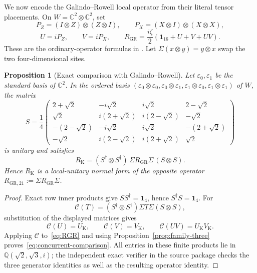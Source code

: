 \documentclass[11pt]{article}
\newtheorem{proposition}[theorem]{Proposition}
\theoremstyle{remark}
\newcommand{\Id}{\mathbf 1}
\newcommand{\bbC}{\mathbb C}
\newcommand{\bbQ}{\mathbb Q}
\begin{document}
We now encode the Galindo--Rowell local operator from their literal tensor
placements.  On \(W=\bbC^2\otimes\bbC^2\), set
\[
  P_Z=(I\otimes Z)\otimes(Z\otimes I),\qquad
  P_X=(X\otimes I)\otimes(X\otimes X),
\]
\begin{equation}
  U=iP_Z,\qquad V=iP_X,\qquad
  R_{\mathrm{GR}}=\frac{i\zeta}{2}
  \left(\Id_{16}+U+V+UV\right).
  \label{eq:RGR}
\end{equation}
These are the ordinary-operator formulas in
\cite[\S13]{GalindoRowell2026}.
Let \(\Sigma(x\otimes y)=y\otimes x\) swap the two four-dimensional sites.

\begin{proposition}[Exact comparison with Galindo--Rowell]
\label{prop:concurrent-comparison}
Let \(\varepsilon_0,\varepsilon_1\) be the standard basis of \(\bbC^2\).  In
the ordered basis
\((\varepsilon_0\otimes\varepsilon_0,\varepsilon_0\otimes\varepsilon_1,
\varepsilon_1\otimes\varepsilon_0,\varepsilon_1\otimes\varepsilon_1)\) of \(W\),
the matrix
\[
S=\frac14\begin{pmatrix}
2+\sqrt2 & -i\sqrt2 & i\sqrt2 & 2-\sqrt2\\
\sqrt2 & i(2+\sqrt2) & i(2-\sqrt2) & -\sqrt2\\
-(2-\sqrt2) & -i\sqrt2 & i\sqrt2 & -(2+\sqrt2)\\
-\sqrt2 & i(2-\sqrt2) & i(2+\sqrt2) & \sqrt2
\end{pmatrix}
\]
is unitary and satisfies
\begin{equation}
  R_{\mathrm K}
  =(S^\dagger\otimes S^\dagger)\,
    \Sigma R_{\mathrm{GR}}\Sigma\,(S\otimes S).
  \label{eq:concurrent-comparison}
\end{equation}
Hence \(R_{\mathrm K}\) is a local-unitary normal form of the opposite
operator \(R_{\mathrm{GR},21}:=\Sigma R_{\mathrm{GR}}\Sigma\).
\end{proposition}

\begin{proof}
Exact row inner products give \(SS^\dagger=\Id_4\), hence
\(S^\dagger S=\Id_4\).  For
\[
  \mathcal C(T)=(S^\dagger\otimes S^\dagger)\Sigma T\Sigma(S\otimes S),
\]
substitution of the displayed matrices gives
\[
  \mathcal C(U)=U_{\mathrm K},\qquad
  \mathcal C(V)=V_{\mathrm K},\qquad
  \mathcal C(UV)=U_{\mathrm K}V_{\mathrm K}.
\]
Applying \(\mathcal C\) to~\eqref{eq:RGR} and using
Proposition~\ref{prop:family-three} proves~\eqref{eq:concurrent-comparison}.
All entries in these finite products lie in
\(\bbQ(\sqrt2,\sqrt3,i)\); the independent exact verifier in the source
package checks the three generator identities as well as the resulting
operator identity.
\end{proof}
\end{document}
